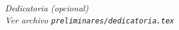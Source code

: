 
\thispagestyle{empty}
{}

\hfill
\vfill

\begin{flushright}
\itshape
Dedicatoria (opcional) \\
Ver archivo \texttt{preliminares/dedicatoria.tex}
\end{flushright}

\vfill

\cleardoublepage
\endinput
